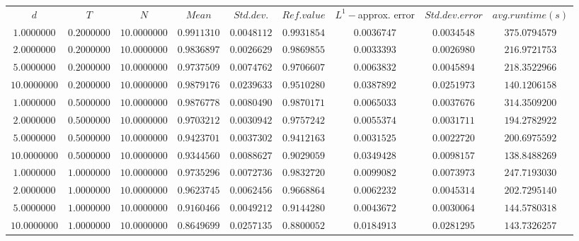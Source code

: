 \begin{tabular}{ccccccccc}
$d$ & $T$ & $N$ & $Mean$ & $Std. dev.$ & $Ref. value$ & $L^1-$approx. error & $Std. dev. error$ & $avg. runtime (s)$\\
$1.0000000$ & $0.2000000$ & $10.0000000$ & $0.9911310$ & $0.0048112$ & $0.9931854$ & $0.0036747$ & $0.0034548$ & $375.0794579$\\
$2.0000000$ & $0.2000000$ & $10.0000000$ & $0.9836897$ & $0.0026629$ & $0.9869855$ & $0.0033393$ & $0.0026980$ & $216.9721753$\\
$5.0000000$ & $0.2000000$ & $10.0000000$ & $0.9737509$ & $0.0074762$ & $0.9706607$ & $0.0063832$ & $0.0045894$ & $218.3522966$\\
$10.0000000$ & $0.2000000$ & $10.0000000$ & $0.9879176$ & $0.0239633$ & $0.9510280$ & $0.0387892$ & $0.0251973$ & $140.1206158$\\
$1.0000000$ & $0.5000000$ & $10.0000000$ & $0.9876778$ & $0.0080490$ & $0.9870171$ & $0.0065033$ & $0.0037676$ & $314.3509200$\\
$2.0000000$ & $0.5000000$ & $10.0000000$ & $0.9703212$ & $0.0030942$ & $0.9757242$ & $0.0055374$ & $0.0031711$ & $194.2782922$\\
$5.0000000$ & $0.5000000$ & $10.0000000$ & $0.9423701$ & $0.0037302$ & $0.9412163$ & $0.0031525$ & $0.0022720$ & $200.6975592$\\
$10.0000000$ & $0.5000000$ & $10.0000000$ & $0.9344560$ & $0.0088627$ & $0.9029059$ & $0.0349428$ & $0.0098157$ & $138.8488269$\\
$1.0000000$ & $1.0000000$ & $10.0000000$ & $0.9735296$ & $0.0072736$ & $0.9832720$ & $0.0099082$ & $0.0073973$ & $247.7193030$\\
$2.0000000$ & $1.0000000$ & $10.0000000$ & $0.9623745$ & $0.0062456$ & $0.9668864$ & $0.0062232$ & $0.0045314$ & $202.7295140$\\
$5.0000000$ & $1.0000000$ & $10.0000000$ & $0.9160466$ & $0.0049212$ & $0.9144280$ & $0.0043672$ & $0.0030064$ & $144.5780318$\\
$10.0000000$ & $1.0000000$ & $10.0000000$ & $0.8649699$ & $0.0257135$ & $0.8800052$ & $0.0184913$ & $0.0281295$ & $143.7326257$\\
\end{tabular}
